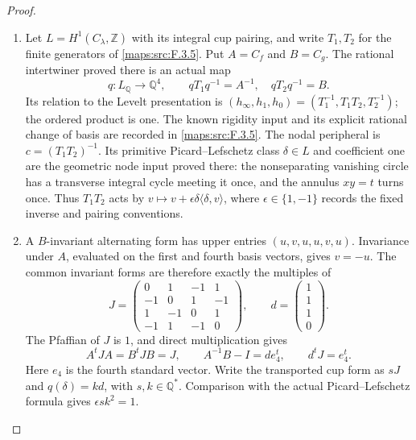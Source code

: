 \documentclass[11pt,a4paper]{article}
\theoremstyle{definition}
\begin{document}
\begin{proof}
\begin{enumerate}[label=\arabic*.]
\item Let $L=H^1(C_\lambda,\mathbb Z)$ with its integral cup pairing,
and write $T_1,T_2$ for the finite generators of
\cref{maps:src:F.3.5}. Put $A=C_f$ and $B=C_g$.
The rational intertwiner proved there is an actual map
\[
 q:L_{\mathbb Q}\longrightarrow\mathbb Q^4,
 \qquad qT_1q^{-1}=A^{-1},\quad qT_2q^{-1}=B.
\]
Its relation to the Levelt presentation is
$(h_\infty,h_1,h_0)=(T_1^{-1},T_1T_2,T_2^{-1})$;
the ordered product is one. The known rigidity input and its explicit
rational change of basis are recorded in \cref{maps:src:F.3.5}.
The nodal peripheral is $c=(T_1T_2)^{-1}$. Its primitive
Picard--Lefschetz class $\delta\in L$ and coefficient one are the
geometric node input proved there: the nonseparating vanishing circle
has a transverse integral cycle meeting it once, and the annulus
$xy=t$ turns once. Thus $T_1T_2$ acts by
$v\mapsto v+\epsilon\delta\langle\delta,v\rangle$,
where $\epsilon\in\{1,-1\}$ records the fixed inverse and pairing
conventions.

\item A $B$-invariant alternating form has upper entries
$(u,v,u,u,v,u)$. Invariance under $A$, evaluated on the first and
fourth basis vectors, gives $v=-u$. The common invariant forms are
therefore exactly the multiples of
\[
 J=\begin{pmatrix}
 0&1&-1&1\\-1&0&1&-1\\1&-1&0&1\\-1&1&-1&0
 \end{pmatrix},\qquad
 d=\begin{pmatrix}1\\1\\1\\0\end{pmatrix}.
\]
The Pfaffian of $J$ is $1$, and direct multiplication gives
\[
 A^tJA=B^tJB=J,\qquad
 A^{-1}B-I=d e_4^t,\qquad d^tJ=e_4^t.
\]
Here $e_4$ is the fourth standard vector. Write the transported cup
form as $sJ$ and $q(\delta)=k d$, with $s,k\in\mathbb Q^*$.
Comparison with the actual Picard--Lefschetz formula gives
$\epsilon s k^2=1$.


\end{enumerate}
\end{proof}
\end{document}
